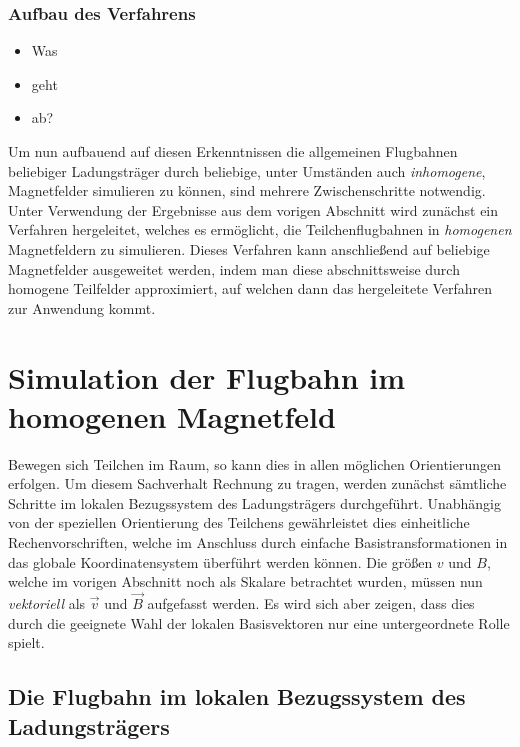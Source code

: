 \mode*
\begin{frame}
  \frametitle{Aufbau des Verfahrens}
  \begin{itemize}
    \item Was
    \item geht
    \item ab?
  \end{itemize}
\end{frame}


Um nun aufbauend auf diesen Erkenntnissen die allgemeinen Flugbahnen beliebiger Ladungstr\"ager durch beliebige, unter Umst\"anden
auch \textit{inhomogene}, Magnetfelder simulieren zu k\"onnen, sind mehrere Zwischenschritte notwendig.
Unter Verwendung der Ergebnisse aus dem vorigen Abschnitt wird zun\"achst ein Verfahren hergeleitet, welches es erm\"oglicht,
die Teilchenflugbahnen in \textit{homogenen} Magnetfeldern zu simulieren. Dieses Verfahren kann anschlie{\ss}end auf beliebige
Magnetfelder ausgeweitet werden, indem man diese abschnittsweise durch homogene Teilfelder approximiert, auf welchen dann das
hergeleitete Verfahren zur Anwendung kommt.

\section{Simulation der Flugbahn im homogenen Magnetfeld}

Bewegen sich Teilchen im Raum, so kann dies in allen m\"oglichen Orientierungen erfolgen. Um diesem Sachverhalt Rechnung zu tragen,
werden zun\"achst s\"amtliche Schritte im lokalen Bezugssystem des Ladungstr\"agers durchgef\"uhrt. Unabh\"angig von der speziellen
Orientierung des Teilchens gew\"ahrleistet dies einheitliche Rechenvorschriften, welche im Anschluss durch einfache
Basistransformationen in das globale Koordinatensystem \"uberf\"uhrt werden k\"onnen. Die gr\"o{\ss}en \(v\) und \(B\), welche
im vorigen Abschnitt noch als Skalare betrachtet wurden, m\"ussen nun \textit{vektoriell} als \(\vec{v}\) und \(\vec{B}\)
aufgefasst werden. Es wird sich aber zeigen, dass dies durch die geeignete Wahl der lokalen Basisvektoren nur eine untergeordnete Rolle
spielt.

\subsection{Die Flugbahn im lokalen Bezugssystem des Ladungstr\"agers}
\label{sec:lokales_bezugssystem}

